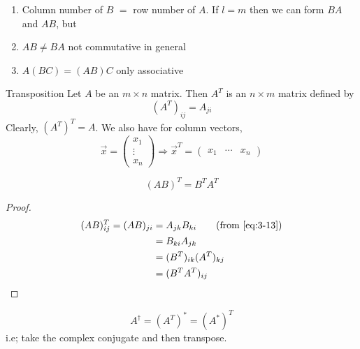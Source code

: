 \documentclass{article}
\numberwithin{equation}{section}
\begin{document}
\begin{enumdescript}
    \begin{remark}\leavevmode
        \begin{enumerate}
            \item Column number of $B$ $=$ row number of $A$. 
            If $l = m$ then we can form $BA$ and $AB$, but 
            \item $AB \neq BA$ not commutative in general
            \item $A(BC) = (AB)C$ only associative
        \end{enumerate}
    \end{remark}
    \item[Transposition] Let $A$ be an $m \times n$ matrix. Then $A^T$ is an $n \times m$ matrix defined by
    \[
        (A^T)_{ij} = A_{ji}  
    \]
    Clearly, $(A^T)^T = A$. We also have for column vectors,
    \[
        \vec x = \begin{pmatrix}
                x_1 \\ \vdots \\ x_n
        \end{pmatrix}
        \Rightarrow 
        \vec x^T = \begin{pmatrix}
            x_1 & \cdots & x_n
        \end{pmatrix}
    \]
    \begin{prop}
        \begin{equation}\label{eq:3-14}
            (AB)^T = B^TA^T
        \end{equation}
    \end{prop}
    \begin{proof}
        \begin{align*}
            (AB)^T_{ij} = (AB)_{ji} &= A_{jk}B_{ki} \tag{from \eqref{eq:3-13}} \\
            &= B_{ki}A_{jk} \\
            &= (B^T)_{ik}(A^T)_{kj} \\
            &= (B^TA^T)_{ij}
        \end{align*}
    \end{proof}

    \begin{defi}
        \begin{equation}\label{eq:3-15}
            A^\dagger = (A^T)^* = (A^*)^T
        \end{equation}
        i.e; take the complex conjugate and then transpose.
    \end{defi}
    

\end{enumdescript}
\end{document}
